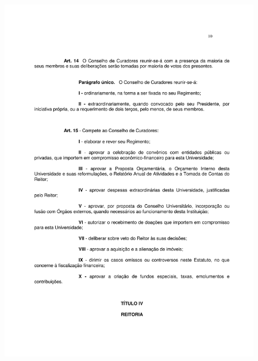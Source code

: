 \begin{figure}[p]
	\centering 
	\includegraphics[scale=0.7]{capitulos/resolucoes/cuni414/cuni414-10.pdf}
\end{figure} \pagebreak

